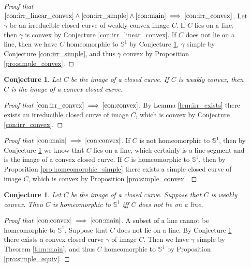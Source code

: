 \documentclass{amsart}
\newtheorem{conjecture}[proposition]{Conjecture}
\theoremstyle{definition}
\theoremstyle{remark}
\begin{document}
\begin{proof}[Proof that
        $\ref{con:irr_linear_convex}
            \land\ref{con:irr_simple}
            \land\ref{con:main}
            \implies\ref{con:irr_convex}$]
    \sloppy
    Let $\gamma$ be an irreducible closed curve of weakly convex
    image $C$. If $C$ lies on a line, then $\gamma$
    is convex by Conjecture \ref{con:irr_linear_convex}.
    If $C$ does not lie on a line,
    then we have $C$ homeomorphic to $\mathbb{S}^1$ by Conjecture \ref{con:main},
    $\gamma$ simple by Conjecture \ref{con:irr_simple},
    and thus $\gamma$ convex by Proposition \ref{pro:simple_convex}.
\end{proof}

\begin{conjecture}
    \label{con:convex}
    Let $C$ be the image of a closed curve. If $C$ is weakly convex,
    then $C$ is the image of a convex closed curve.
\end{conjecture}

\begin{proof}[Proof that $\ref{con:irr_convex}
            \implies\ref{con:convex}$]
    By Lemma \ref{lem:irr_exists} there exists an irreducible
    closed curve of image $C$,
    which is convex by Conjecture \ref{con:irr_convex}.
\end{proof}

\begin{proof}[Proof that $\ref{con:main}\implies\ref{con:convex}$]
    If $C$ is not homeomorphic to $\mathbb{S}^1$, then by Conjecture
    \ref{con:main} we know that $C$ lies on a line,
    which certainly is a line segment and is the image of a convex closed curve.
    If $C$ is homeomorphic to $\mathbb{S}^1$, then by Proposition \ref{pro:homeomorphic_simple}
    there exists a simple closed curve of image $C$,
    which is convex by Proposition \ref{pro:simple_convex}.
\end{proof}

\begin{conjecture}
    \label{con:main}
    Let $C$ be the image of a closed curve.
    Suppose that $C$ is weakly convex. Then $C$ is homeomorphic
    to $\mathbb{S}^1$ iff $C$ does not lie on a line.
\end{conjecture}

\begin{proof}[Proof that $\ref{con:convex}\implies\ref{con:main}$]
    A subset of a line cannot be homeomorphic to $\mathbb{S}^1$.
    Suppose that $C$ does not lie on a line. By Conjecture
    \ref{con:convex} there exists a convex closed curve
    $\gamma$ of image $C$. Then we have $\gamma$ simple by Theorem
    \ref{thm:main}, and thus $C$ homeomorphic to $\mathbb{S}^1$ by
    Proposition \ref{pro:simple_equiv}.
\end{proof}
\end{document}
